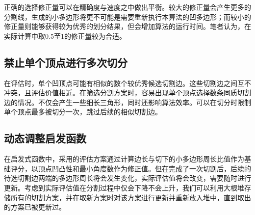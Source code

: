 正确的选择修正量可以在精确度与速度之中做出平衡。较大的修正量会产生更多的分割线，生成的小多边形将更不可能是需要重新执行本算法的凹多边形；而较小的修正量则能够获得较为优秀的划分结果，但会增加算法的运行时间。笔者认为，在实际计算中取0.5至1的修正量较为合适。

\subsection{禁止单个顶点进行多次切分}
在评估时，单个凹顶点可能有相似的数个较优秀候选切割边。这些切割边之间互不冲突，且评估价值相近。在筛选分割方案时，容易出现单个顶点选择数条同质切割边的情况。不仅会产生一些细长三角形，同时还影响算法效率。可以在切分时限制单个顶点最多被切分一次，跳过后续的相似切割边。
\subsection{动态调整启发函数}
在启发式函数中，采用的评估方案通过计算边长与切下的小多边形周长比值作为基础评分，以顶点凹凸性和最小角度数作为修正值。但在完成了一次切割后，后续的待选切割边两端的多边形周长将会发生变化，实际评估值将会改变，需要随时进行更新。考虑到实际评估值在分割过程中仅会下降不会上升，我们可以利用大根堆存储所有的切割方案，并在取新方案时对该方案进行更新并重新放入堆中，直到取出的方案已被更新过。








